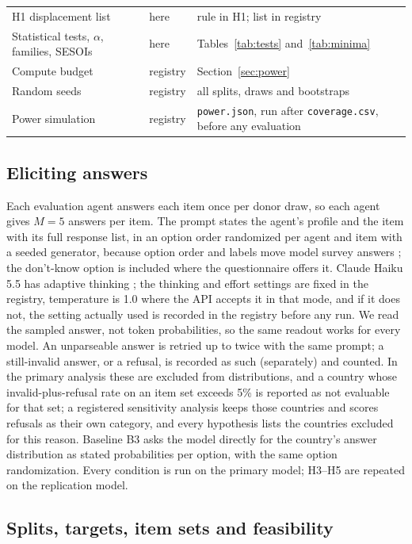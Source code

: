 \documentclass[10pt]{article}
\begin{document}
\begin{table}[!htbp]
\begin{tabular}{@{}L{5.0cm}L{1.4cm}L{8.0cm}@{}}
H1 displacement list & here & rule in H1; list in registry \\
Statistical tests, $\alpha$, families, SESOIs & here & Tables~\ref{tab:tests} and~\ref{tab:minima} \\
Compute budget & registry & Section~\ref{sec:power} \\
Random seeds & registry & all splits, draws and bootstraps \\
Power simulation & registry & \nolinkurl{power.json}, run after \nolinkurl{coverage.csv}, before any evaluation \\
\bottomrule
\end{tabular}
\end{table}

\subsection{Eliciting answers}
\label{sec:elicit}

Each evaluation agent answers each item once per donor draw, so each agent gives $M = 5$ answers per item. The prompt states the agent's profile and the item with its full response list, in an option order randomized per agent and item with a seeded generator, because option order and labels move model survey answers \citep{dominguez2024,tjuatja2024}; the don't-know option is included where the questionnaire offers it. Claude Haiku 5.5 has adaptive thinking \citep{claudemodels}; the thinking and effort settings are fixed in the registry, temperature is 1.0 where the API accepts it in that mode, and if it does not, the setting actually used is recorded in the registry before any run. We read the sampled answer, not token probabilities, so the same readout works for every model. An unparseable answer is retried up to twice with the same prompt; a still-invalid answer, or a refusal, is recorded as such (separately) and counted. In the primary analysis these are excluded from distributions, and a country whose invalid-plus-refusal rate on an item set exceeds 5\% is reported as not evaluable for that set; a registered sensitivity analysis keeps those countries and scores refusals as their own category, and every hypothesis lists the countries excluded for this reason. Baseline B3 asks the model directly for the country's answer distribution as stated probabilities per option, with the same option randomization. Every condition is run on the primary model; H3--H5 are repeated on the replication model.

\subsection{Splits, targets, item sets and feasibility}
\label{sec:splits}
\end{document}
